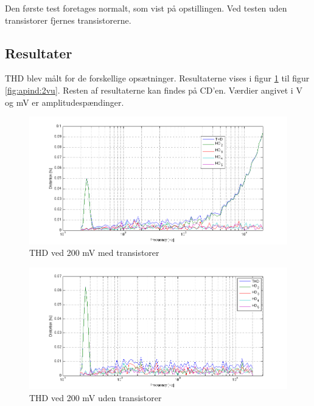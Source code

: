 Den første test foretages normalt, som vist på opstillingen. Ved testen uden transistorer fjernes transistorerne.	

\subsection*{Resultater}

THD blev målt for de forskellige opsætninger. Resultaterne vises i figur \ref{fig:apind:200mvm} til figur \ref{fig:apind:2vu}. Resten af resultaterne kan findes på CD'en. Værdier angivet i V og mV er amplitudespændinger.

\begin{figure}[h]
\centering
\includegraphics[width=\textwidth]{maalerapporter/indgangsvaelger/maalinger/opa/mic-200mv-opa-muxudgang-thd.png}
\caption{THD ved 200 mV med transistorer}
\label{fig:apind:200mvm}
\end{figure}

\begin{figure}[h]
\centering
\includegraphics[width=\textwidth]{maalerapporter/indgangsvaelger/maalinger/opa/mic-200mv-opa-muxudgang-uden-transistor thd.png}
\caption{THD ved 200 mV uden transistorer}
\label{fig:apind:200mvu}
\end{figure}

